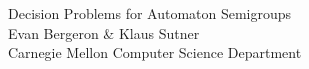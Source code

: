 \documentclass[a0]{a0poster}
\newcommand*{\concourse}{}
\theoremstyle{pleasant}
\newcommand{\0}{\underline{0}}
\newcommand{\1}{\underline{1}}
\newcommand{\2}{\underline{2}}
\begin{document}


\begin{minipage}[b]{0.55\linewidth}
\veryHuge \color{NavyBlue} \concourse{Decision Problems for Automaton Semigroups} \color{Black}\\ %
\huge \concourse{Evan Bergeron \& Klaus Sutner}\\ %
\huge Carnegie Mellon Computer Science Department\\ %
\end{minipage}



\end{document}

